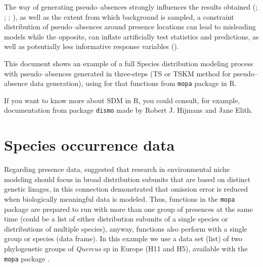 \documentclass[10pt,a4paper]{report}
\begin{document}
The way of generating pseudo--absences strongly influences the results obtained (\citet{lobo_uncertain_2010}; \citet{wisz_pseudo-absence_2009}; \citet{barbet-massin_selecting_2012}; \citet{hirzel_assessing_2001}), as well as the extent from which background is sampled, a constraint distribution of pseudo--absences around presence locations can lead to misleading models while the opposite, can inflate artificially test statistics and predictions, as well as potentially less informative response variables  (\citet{jeremy_vanderwal_selecting_2009}).

This document shows an example of a full Species distribution modeling process with pseudo--absences generated in three-steps (TS or TSKM method for pseudo--absence data generation), using for that functions from \texttt{mopa} package in R. 

If you want to know more about SDM in R, you could consult, for example, documentation from package \texttt{dismo} made by Robert J. Hijmans and Jane Elith.



\section{Species occurrence data}

Regarding presence data, \citet{hernandez_effect_2006} suggested that research in environmental niche modeling should focus in broad distribution subunits that are based on distinct genetic linages, in this connection \citet{gonzalez_population_2011} demonstrated that omission error is reduced when biologically meaningful data is modeled. Thus, functions in the \texttt{mopa} package are prepared to run with more than one group of presences at the same time (could be a list of either distribution subunits of a single species or distributions of multiple species), anyway, functions also perform with a single group or species (data frame). In this example we use a data set (list) of two phylogenetic groups of \textit{Quercus} sp in Europe (H11 and H5), available with the \texttt{mopa} package . 
\end{document}
